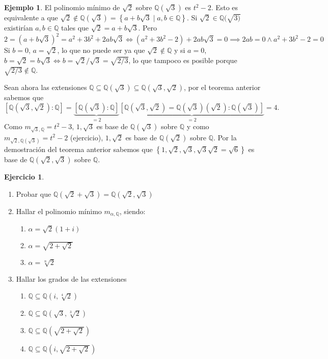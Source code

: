 \documentclass[10pt, spanish]{report}
\theoremstyle{definition}
\newtheorem*{ej}{Ejemplo}
\newtheorem*{ejer}{Ejercicio}
\newcommand{\Q}{\mathbb{Q}}
\begin{document}
\begin{ej}
    El polinomio mínimo de $\sqrt{2}$ sobre $\Q(\sqrt{3})$ es
    $t^2-2$. Esto es equivalente a que
    $\sqrt{2}\not\in\Q(\sqrt{3})=\left\{ a+b\sqrt{3}\mid a,b\in\Q\right\}$. Si
    $\sqrt{2}\in\Q(\sqrt{3)}$ existirían $a,b\in\Q$ tales que
    $\sqrt{2}=a+b\sqrt{3}$. Pero \[2=(a+b\sqrt{3})^2=a^2+3b^2+2ab\sqrt{3}
        \Leftrightarrow (a^2+3b^2-2)+2ab\sqrt{3}=0 \implies 2ab=0 \wedge
        a^2+3b^2-2=0\]
     Si $b=0$, $a=\sqrt{2}$, lo que no puede ser ya que $\sqrt{2}\not\in\Q$ y
     si $a=0$, $b=\sqrt{2}=b\sqrt{3} \Leftrightarrow b={\sqrt{2}}/{\sqrt{3}}=
     \sqrt{{2}/{3}}$, lo que tampoco es posible porque $\sqrt{{2}/{3}}\not\in\Q$.

    Sean ahora las extensiones $\Q\subseteq\Q(\sqrt{3})\subseteq
    \Q(\sqrt{3},\sqrt{2})$, por el teorema anterior sabemos que
    \[[\Q(\sqrt{3},\sqrt{2}):\Q]=\underbrace{[\Q(\sqrt{3}):\Q]}_{=2}\underbrace{
      [\Q(\sqrt{3},\sqrt{2})=\Q(\sqrt{3})(\sqrt{2}):\Q(\sqrt{3})]}_{=2}=4.\]
    Como $m_{\sqrt{3},\Q}=t^2-3$, $1,\sqrt{3}$ es base de $\Q(\sqrt{3})$ sobre
    $\Q$ y como $m_{\sqrt{2},\Q(\sqrt{3})}=t^2-2$ (ejercicio), $1,\sqrt{2}$ es
    base de $\Q(\sqrt{2})$ sobre $\Q$. Por la demostración del teorema anterior
    sabemos que $\left\{1,\sqrt{2},\sqrt{3},\sqrt{3}\sqrt{2}=\sqrt{6}\right\}$
    es base de $\Q(\sqrt{2},\sqrt{3})$ sobre $\Q$.
\end{ej}

\begin{ejer}\hspace{0pt}
    \begin{enumerate}
        \item Probar que $\Q(\sqrt{2}+\sqrt{3})=\Q(\sqrt{2},\sqrt{3})$
        \item Hallar el polinomio mínimo $m_{\alpha,\Q}$, siendo:
            \begin{multicols}{4}
                \begin{enumerate}
                    \item $\alpha=\sqrt{2}(1+i)$
                    \item $\alpha=\sqrt{2+\sqrt{2}}$
                    \item $\alpha=\sqrt[n]{2}$
                \end{enumerate}
            \end{multicols}
        \item Hallar los grados de las extensiones
            \begin{multicols}{2}
                \begin{enumerate}
                    \item $\Q\subseteq\Q(i,\sqrt[4]{2})$
                    \item $\Q\subseteq\Q\left(\sqrt{3},\sqrt[3]{2}\right)$
                    \item $\Q\subseteq\Q\left(\sqrt{2+\sqrt{2}}\right)$
                    \item $\Q\subseteq\Q\left(i,\sqrt{2+\sqrt{2}}\right)$
                \end{enumerate}
            \end{multicols}
    \end{enumerate}
\end{ejer}
\end{document}
